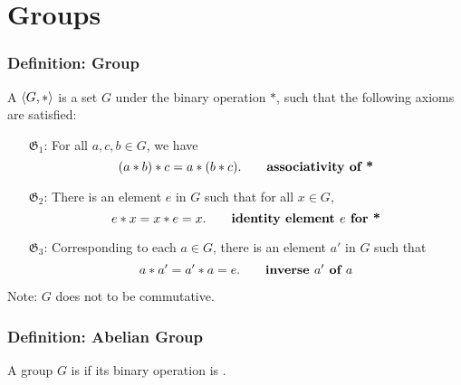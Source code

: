 \section{Groups}

\subsubsection*{Definition: Group}
A  $\langle G,* \rangle$ is a set $G$  under the binary operation $*$, such that the following axioms are satisfied:
\begin{enumerate}
    \item[$\mathfrak{G}_1$:] For all $a,c,b \in G$, we have
    \[
        (a*b)*c = a*(b*c). \qquad \textbf{associativity of *}
    \]
    \item[$\mathfrak{G}_2$:] There is an element $e$ in $G$ such that for all $x \in G$,
    \[
        e*x=x*e=x. \qquad \textbf{identity element $e$ for *}
    \]
    \item[$\mathfrak{G}_3$:] Corresponding to each $a \in G$, there is an element $a'$ in $G$ such that
    \[
        a*a'=a'*a=e. \qquad \textbf{inverse $a'$ of $a$}
    \]
\end{enumerate}
Note: $G$ does not  to be commutative.

\subsubsection*{Definition: Abelian Group}
A group $G$ is  if its binary operation is .